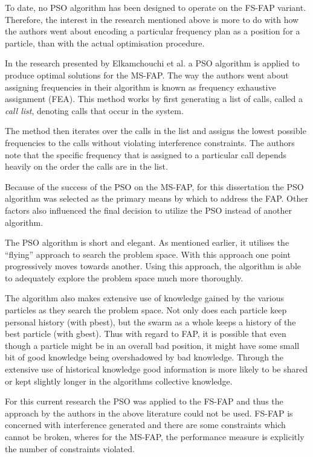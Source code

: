 To date, no PSO algorithm has been designed to operate on the FS-FAP variant. Therefore, the interest in the research mentioned above is more to do with how the authors went about encoding a particular frequency plan as a position for a particle, than with the actual optimisation procedure.

In the research presented by Elkamchouchi et al.\cite{EgyptFAPPSO} a PSO algorithm is applied to produce optimal solutions for the MS-FAP. The way the authors went about assigning frequencies in their algorithm is known as frequency exhaustive assignment (FEA).
This method works by first generating a list of calls, called a \emph{call list}, denoting calls that occur in the system\cite{EgyptFAPPSO}. 

The method then iterates over the calls in the list and assigns the lowest possible frequencies to the calls without violating interference constraints\cite{EgyptFAPPSO}. The authors note that the specific frequency that is assigned to a particular call depends heavily on the order the calls are in the list\cite{EgyptFAPPSO}.

Because of the success of the PSO on the MS-FAP, for this dissertation the PSO algorithm was selected as the primary means by which to address the FAP. Other factors also influenced the final decision to utilize the PSO instead of another algorithm.

The PSO algorithm is short and elegant. As mentioned earlier, it utilises the ``flying'' approach to search the problem space. With this approach one point progressively moves towards another. Using this approach, the algorithm is able to adequately explore the problem space much more thoroughly.

The algorithm also makes extensive use of knowledge gained by the various particles as they search the problem space. Not only does each particle keep personal history (with pbest), but the swarm as a whole keeps a history of the best particle (with gbest). Thus with regard to FAP, it is possible that even though a particle might be in an overall bad position, it might have some small bit of good knowledge being overshadowed by bad knowledge. Through the extensive use of historical knowledge good information is more likely to be shared or kept slightly longer in the algorithms collective knowledge.

For this current research the PSO was applied to the FS-FAP and thus the approach by the authors in the above literature could not be used. FS-FAP is concerned with interference generated and there are some constraints which cannot be broken, wheres for the MS-FAP, the performance measure is explicitly the number of constraints violated.

